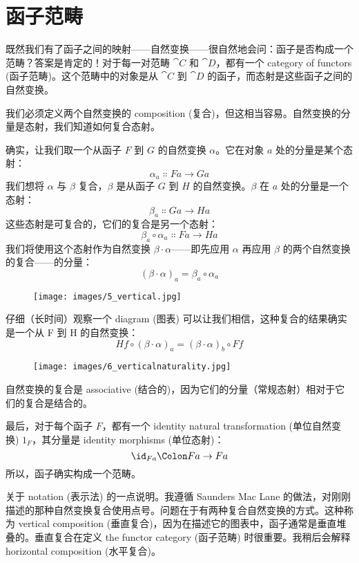 \section{函子范畴}

既然我们有了函子之间的映射——自然变换——很自然地会问：函子是否构成一个范畴？答案是肯定的！对于每一对范畴 $\cat{C}$ 和 $\cat{D}$，都有一个 category of functors (函子范畴)。这个范畴中的对象是从 $\cat{C}$ 到 $\cat{D}$ 的函子，而态射是这些函子之间的自然变换。

我们必须定义两个自然变换的 composition (复合)，但这相当容易。自然变换的分量是态射，我们知道如何复合态射。

确实，让我们取一个从函子 $F$ 到 $G$ 的自然变换 $\alpha$。它在对象 $a$ 处的分量是某个态射：
\[\alpha_a \Colon F a \to G a\]
我们想将 $\alpha$ 与 $\beta$ 复合，$\beta$ 是从函子 $G$ 到 $H$ 的自然变换。$\beta$ 在 $a$ 处的分量是一个态射：
\[\beta_a \Colon G a \to H a\]
这些态射是可复合的，它们的复合是另一个态射：
\[\beta_a \circ \alpha_a \Colon F a \to H a\]
我们将使用这个态射作为自然变换 $\beta \cdot \alpha$——即先应用 $\alpha$ 再应用 $\beta$ 的两个自然变换的复合——的分量：
\[(\beta \cdot \alpha)_a = \beta_a \circ \alpha_a\]

\begin{figure}[H]
  \centering
  \texttt{[image: images/5\_vertical.jpg]}
\end{figure}

\noindent
仔细（长时间）观察一个 diagram (图表) 可以让我们相信，这种复合的结果确实是一个从 F 到 H 的自然变换：
\[H f \circ (\beta \cdot \alpha)_a = (\beta \cdot \alpha)_b \circ F f\]

\begin{figure}[H]
  \centering
  \texttt{[image: images/6\_verticalnaturality.jpg]}
\end{figure}

\noindent
自然变换的复合是 associative (结合的)，因为它们的分量（常规态射）相对于它们的复合是结合的。

最后，对于每个函子 $F$，都有一个 identity natural transformation (单位自然变换) $1_F$，其分量是 identity morphisms (单位态射)：
\[\id_{F a} \Colon F a \to F a\]
所以，函子确实构成一个范畴。

关于 notation (表示法) 的一点说明。我遵循 Saunders Mac Lane 的做法，对刚刚描述的那种自然变换复合使用点号。问题在于有两种复合自然变换的方式。这种称为 vertical composition (垂直复合)，因为在描述它的图表中，函子通常是垂直堆叠的。垂直复合在定义 the functor category (函子范畴) 时很重要。我稍后会解释 horizontal composition (水平复合)。

